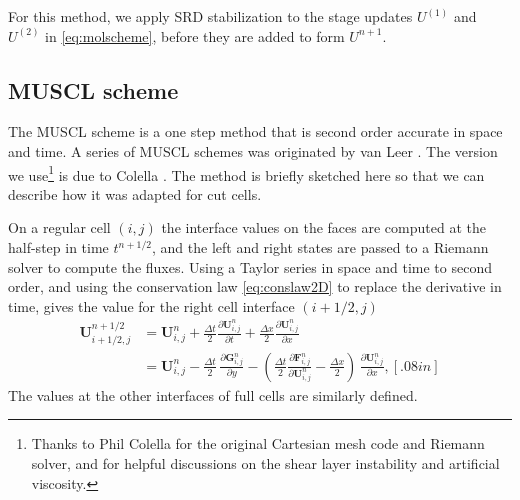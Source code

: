 For this method, we apply SRD stabilization to the stage updates
$U^{(1)}$ and $U^{(2)}$ in \eqref{eq:molscheme}, before they are added to form $U^{n+1}$.

\subsection{MUSCL scheme} \label{sec:muscl}
The MUSCL scheme is a one step method that is second order accurate in
space and time. A series of MUSCL schemes  was originated by van Leer 
\cite{vanleer:muscl}. The version we use\footnote{Thanks to Phil 
Colella for the original Cartesian mesh code and Riemann solver,  and for helpful discussions on the shear
layer instability and artificial viscosity.}
is due to Colella \cite{Colella:Unsplit}.
The method is briefly sketched here so that we can describe how it was
adapted for cut cells. 

On a regular cell $(i,j)$ the interface values on the 
faces are computed at the half-step in time $t^{n+1/2}$, and the left and right states
are passed to a Riemann
solver to compute the fluxes.
Using a Taylor series in space and time to second order,
and using the conservation law \eqref{eq:conslaw2D}  to replace the derivative in time, gives the value for the right cell
interface $(i+1/2,j)$ 
\begin{subequations}
\begin{align}
\label{eqn:taylor}
\mathbf{U}_{i+1/2,j}^{n+1/2}    
              &= \mathbf{U}_{i,j}^n +  
\frac{\Delta t}{2} \frac{\partial \mathbf{U}_{i,j}^n}{\partial t} + 
\frac{\Delta x}{2} \frac{\partial \mathbf{U}_{i,j}^n}{\partial x} \\[.08in]
              &= \mathbf{U}_{i,j}^n - \frac{\Delta t}{2} \, 
             \frac{\partial \mathbf{G}_{i,j}^n}{\partial y}  -
            \left( \frac{\Delta t}{2} 
            \frac{\partial \mathbf{F}_{i,j}^n}{\partial \mathbf{U}^n_{i,j}} -
             \frac{\Delta x}{2} \right) \,\frac{\partial \mathbf{U}_{i,j}^n}{\partial x}, [.08in]
\end{align}
\end{subequations}
The values at the other interfaces of full cells are similarly defined.


